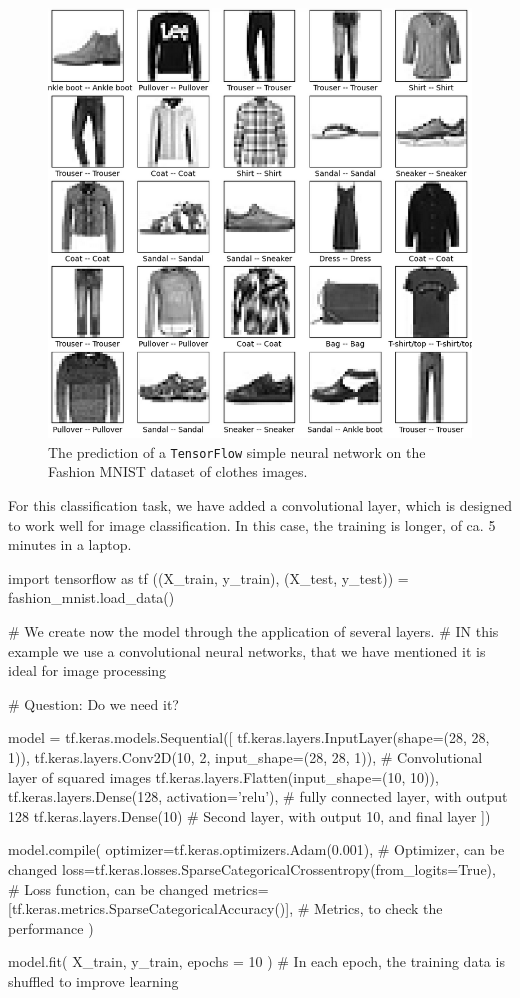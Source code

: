 \documentclass[]{report}
\begin{document}
\begin{figure}\centering
\includegraphics[width = .7\linewidth]{images/fashion-mnist}
\caption{The prediction of a \texttt{TensorFlow} simple neural network on the Fashion MNIST dataset of clothes images.}
\label{fig.fashion-mnist}
\end{figure}

For this classification task, we have added a convolutional layer, which is designed to work well for image classification. In this case, the training is longer, of ca. 5 minutes in a laptop. 

\vskip5mm

\begin{boxedverbatim}
import tensorflow as tf
((X_train, y_train), (X_test, y_test)) = fashion_mnist.load_data()

# We create now the model through the application of several layers. 
# IN this example we use a convolutional neural networks, that we have mentioned it is ideal for image processing

# Question: Do we need it?

model = tf.keras.models.Sequential([
  tf.keras.layers.InputLayer(shape=(28, 28, 1)), 
  tf.keras.layers.Conv2D(10, 2, input_shape=(28, 28, 1)), # Convolutional layer of squared images
  tf.keras.layers.Flatten(input_shape=(10, 10)), 
  tf.keras.layers.Dense(128, activation='relu'), # fully connected layer, with output 128
  tf.keras.layers.Dense(10)                      # Second layer, with output 10, and final layer
])

model.compile(
    optimizer=tf.keras.optimizers.Adam(0.001), # Optimizer, can be changed
    loss=tf.keras.losses.SparseCategoricalCrossentropy(from_logits=True), # Loss function, can be changed
    metrics=[tf.keras.metrics.SparseCategoricalAccuracy()], # Metrics, to check the performance
)

model.fit(
    X_train, y_train, epochs = 10
) # In each epoch, the training data is shuffled to improve learning


\end{boxedverbatim}
\vskip5mm
\end{document}
